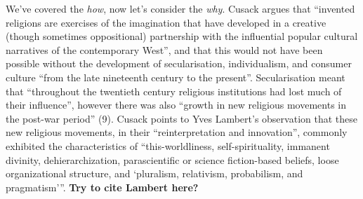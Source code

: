 \documentclass[Draft.tex]{subfiles}
\begin{document}
We've covered the \textit{how}, now let's consider the \textit{why}.
Cusack \parencite*[7]{Cusack10} argues that ``invented religions are
exercises of the imagination that have developed in a creative
(though sometimes oppositional) partnership with the influential
popular cultural narratives of the contemporary West'',
and that this would not have been possible without
the development of secularisation, individualism, and consumer culture
``from the late nineteenth century to the present''.
Secularisation meant that  ``throughout the twentieth century
religious institutions had lost much of their influence'',
however there was also ``growth in new religious movements
in the post-war period'' (9).
Cusack \parencite[9]{Cusack10} points to Yves Lambert's observation that
these new religious movements, in their ``reinterpretation and innovation'', 
commonly exhibited the characteristics of
``this-worldliness, self-spirituality, immanent divinity, dehierarchization,
parascientific or science fiction-based beliefs, loose organizational structure,
and `pluralism, relativism, probabilism, and pragmatism'''.
\textbf{Try to cite Lambert here?}


\end{document}
